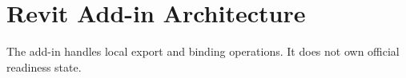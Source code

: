 \section{Revit Add-in Architecture}
The add-in handles local export and binding operations. It does not own official readiness state.

